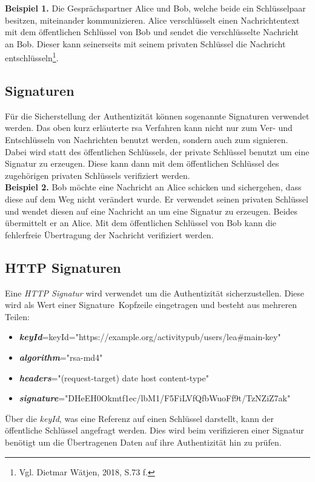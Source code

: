 {	\textbf{Beispiel 1.} Die Gesprächspartner Alice und Bob, welche beide ein Schlüsselpaar besitzen, miteinander kommunizieren. Alice verschlüsselt einen Nachrichtentext mit dem öffentlichen Schlüssel von Bob und sendet die verschlüsselte Nachricht an Bob. Dieser kann seinerseits mit seinem privaten Schlüssel die Nachricht entschlüsseln\footnote{Vgl. Dietmar Wätjen, 2018, S.73 f.}.\\

	\subsection{Signaturen}
	Für die Sicherstellung der Authentizität können sogenannte Signaturen verwendet werden. Das oben kurz erläuterte \gls{rsa} Verfahren kann nicht nur zum Ver- und Entschlüsseln von Nachrichten benutzt werden, sondern auch zum signieren.\\
	Dabei wird statt des öffentlichen Schlüssels, der private Schlüssel benutzt um eine Signatur zu erzeugen. Diese kann dann mit dem öffentlichen Schlüssel des zugehörigen privaten Schlüssels verifiziert werden.\\
	
	\textbf{Beispiel 2.} Bob möchte eine Nachricht an Alice schicken und sichergehen, dass diese auf dem Weg nicht verändert wurde. Er verwendet seinen privaten Schlüssel und wendet diesen auf eine Nachricht an um eine Signatur zu erzeugen. Beides übermittelt er an Alice. Mit dem öffentlichen Schlüssel von Bob kann die fehlerfreie Übertragung der Nachricht verifiziert werden.\\
	
	\subsection{HTTP Signaturen}
	Eine \textit{HTTP Signatur} wird verwendet um die Authentizität sicherzustellen. Diese wird als Wert einer \glqq Signature\grqq~Kopfzeile eingetragen und besteht aus mehreren Teilen:
	\begin{itemize}
		\item \textit{\textbf{keyId}}=keyId="https://example.org/activitypub/users/lea#main-key"
		\item \textit{\textbf{algorithm}}="rsa-md4"
		\item \textit{\textbf{headers}}="(request-target) date host content-type"
		\item \textit{\textbf{signature}}="DHeEH0Okmtf1ec/lbM1/F5FiLVfQfbWuoFf9t/TzNZiZ7ak"
	\end{itemize}
	Über die \textit{keyId}, was eine Referenz auf einen Schlüssel darstellt, kann der öffentliche Schlüssel angefragt werden. Dies wird beim verifizieren einer Signatur benötigt um die Übertragenen Daten auf ihre Authentizität hin zu prüfen.\\
	
}
